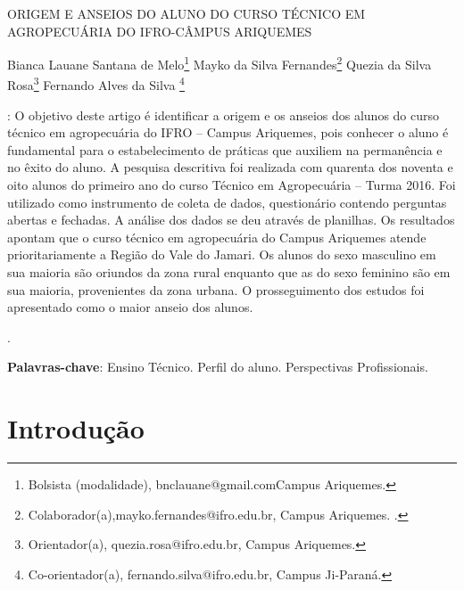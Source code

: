 \documentclass[article,12pt,onesidea,4paper,english,brazil]{abntex2}
\begin{document}
	
	
	\frenchspacing 
	
	\begin{center}
		\LARGE ORIGEM E ANSEIOS DO ALUNO DO CURSO TÉCNICO EM AGROPECUÁRIA DO IFRO-CÂMPUS ARIQUEMES\
		
		
		\normalsize
		Bianca Lauane Santana de Melo\footnote{Bolsista (modalidade), bnclauane@gmail.comCampus Ariquemes. } 
		Mayko da Silva Fernandes\footnote{Colaborador(a),mayko.fernandes@ifro.edu.br, Campus Ariquemes. .} 
	Quezia da Silva Rosa\footnote{Orientador(a), quezia.rosa@ifro.edu.br, Campus Ariquemes.} 
		Fernando Alves da Silva \footnote{ Co-orientador(a), fernando.silva@ifro.edu.br, Campus Ji-Paraná.} 
	\end{center}
	
	\begin{resumoumacoluna}
	: O objetivo deste artigo é identificar a origem e os anseios dos alunos do curso técnico em agropecuária do IFRO – Campus Ariquemes, pois conhecer o aluno é fundamental para o estabelecimento de práticas que auxiliem na permanência e no êxito do aluno. A pesquisa descritiva foi realizada com quarenta dos noventa e oito alunos do primeiro ano do curso Técnico em Agropecuária – Turma 2016. Foi utilizado como instrumento de coleta de dados, questionário contendo perguntas abertas e fechadas. A análise dos dados se deu através de planilhas. Os resultados apontam que o curso técnico em agropecuária do Campus Ariquemes atende prioritariamente a Região do Vale do Jamari. Os alunos do sexo masculino em sua maioria são oriundos da zona rural enquanto que as do sexo feminino são em sua maioria, provenientes da zona urbana. O prosseguimento dos estudos foi apresentado como o maior anseio dos alunos.
	
	.
		
		\vspace{\onelineskip}
		
		\noindent
		\textbf{Palavras-chave}: Ensino Técnico. Perfil do aluno. Perspectivas Profissionais. 
	\end{resumoumacoluna}
	
	\section*{Introdução}
	
\end{document}
